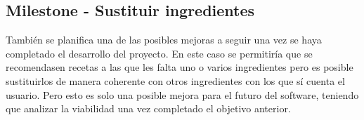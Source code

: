 \subsection{Milestone - Sustituir ingredientes}
También se planifica una de las posibles mejoras a seguir una vez se haya completado el desarrollo del proyecto. En este caso se permitiría que se recomendasen recetas a las que les falta uno o varios ingredientes pero es posible sustituirlos de manera coherente con otros ingredientes con los que sí cuenta el usuario. Pero esto es solo una posible mejora para el futuro del software, teniendo que analizar la viabilidad una vez completado el objetivo anterior. 
